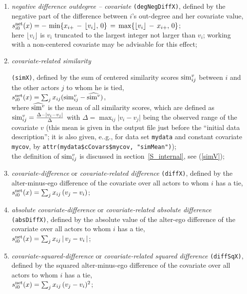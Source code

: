 \documentclass[a4paper,fleqn,11pt]{article}
\newcommand{\+}{\, + \,}
\newcommand{\vit}{\theenumi}
\begin{document}
\begin{enumerate}
 \item {\em negative difference outdegree -- covariate}
 \texttt{(degNegDiffX)},
 defined by the negative part of the difference between $i$'s out-degree
 and her covariate value,\\
 $s^{\rm net}_{i\vit}(x) =  - \, \min \{ x_{i+} \,-\, \lfloor v_i \rfloor  ,\, 0 \}
 \,=\, \max \{ \lfloor v_i \rfloor \,-\, x_{i+} ,\, 0 \}  $;\\
 here $\lfloor v_i \rfloor $ is $v_i$ truncated to the largest integer
 not larger than $v_i$;
 working with a non-centered covariate may be advisable for this effect;

 \item \hypertarget{T_simx}{{\em covariate-related similarity}} \texttt{(simX)},
 \label{simx}
 defined by the sum of centered similarity scores ${\rm sim}^v_{ij}$
 between $i$  and the other actors $j$ to whom he is tied,\\
 $s^{\rm net}_{i\vit}(x) = \sum_j x_{ij} ({\rm sim}^v_{ij} - \widehat{{\rm sim}^v}) $,\\
 where $\widehat{{\rm sim}^v}$ is the mean of all similarity scores, which are defined as
 ${\rm sim}^v_{ij}=\frac{\Delta-\vert v_i - v_j \vert}{\Delta}$ with
 $\Delta=\max_{ij}\vert v_i - v_j \vert$ being the observed range of the covariate $v$
 (this mean is given in the output file just before the
 ``initial data description''; it is also given, e..g., for data set \texttt{mydata}
 and constant covariate \texttt{mycov}, by
 \texttt{attr(mydata\$cCovars\$mycov, "simMean")});\\
 the definition of ${\rm sim}^v_{ij}$ is discussed in
 section~\ref{S_internal}, see (\ref{simV});

 \item {\em covariate-difference} or {\em covariate-related difference}
 \texttt{(diffX)},
 defined by the alter-minus-ego difference of the covariate over all actors
 to whom $i$ has a tie,\\
 $s^{\rm net}_{i\vit}(x) = \sum_j x_{ij}\, (v_j - v_i)$;

 \item {\em absolute covariate-difference} or {\em covariate-related absolute difference}
 \texttt{(absDiffX)},
 defined by the absolute value of the alter-ego difference of the covariate over all actors
 to whom $i$ has a tie,\\
 $s^{\rm net}_{i\vit}(x) = \sum_j x_{ij}\, |\,v_j - v_i\,|$;

 \item {\em covariate-squared-difference} or {\em covariate-related squared difference}
 \texttt{(diffSqX)},
 defined by the squared alter-minus-ego difference of the covariate over all actors
 to whom $i$ has a tie,\\
 $s^{\rm net}_{i\vit}(x) = \sum_j x_{ij}\, (v_j - v_i)^2$;


\end{enumerate}
\end{document}
